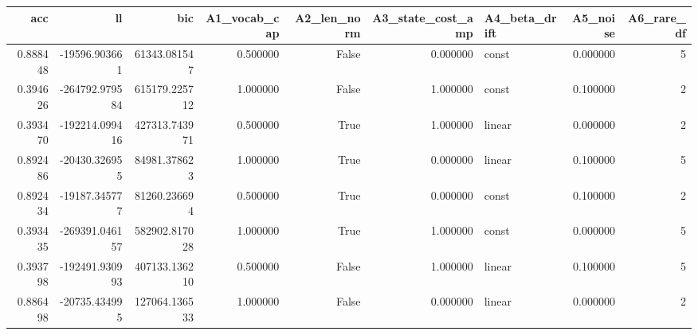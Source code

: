\begin{tabular}{rrrrrrlrr}
\toprule
acc & ll & bic & A1\_vocab\_cap & A2\_len\_norm & A3\_state\_cost\_amp & A4\_beta\_drift & A5\_noise & A6\_rare\_df \\
\midrule
0.888448 & -19596.903661 & 61343.081547 & 0.500000 & False & 0.000000 & const & 0.000000 & 5 \\
0.394626 & -264792.979584 & 615179.225712 & 1.000000 & False & 1.000000 & const & 0.100000 & 2 \\
0.393470 & -192214.099416 & 427313.743971 & 0.500000 & True & 1.000000 & linear & 0.000000 & 2 \\
0.892486 & -20430.326955 & 84981.378623 & 1.000000 & True & 0.000000 & linear & 0.100000 & 5 \\
0.892434 & -19187.345777 & 81260.236694 & 0.500000 & True & 0.000000 & const & 0.100000 & 2 \\
0.393435 & -269391.046157 & 582902.817028 & 1.000000 & True & 1.000000 & const & 0.000000 & 5 \\
0.393798 & -192491.930993 & 407133.136210 & 0.500000 & False & 1.000000 & linear & 0.100000 & 5 \\
0.886498 & -20735.434995 & 127064.136533 & 1.000000 & False & 0.000000 & linear & 0.000000 & 2 \\
\bottomrule
\end{tabular}

